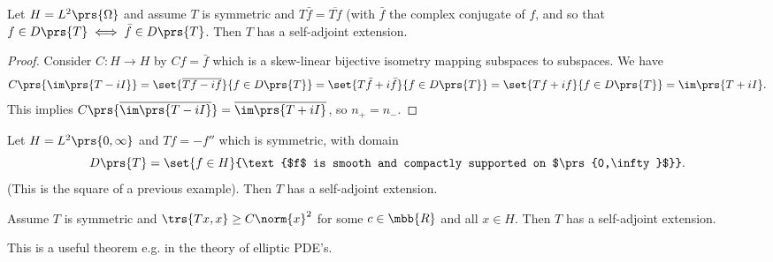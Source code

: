 \documentclass[10pt, twoside]{book}
\begin{document}
\begin{proposition}
Let $H = L^2\prs{\Omega}$ and assume $T$ is symmetric and $T \bar{f} = \overline{Tf}$ (with $\bar{f}$ the complex conjugate of $f$, and so that $f \in D\prs{T} \iff \bar{f} \in D\prs{T}$. Then $T$ has a self-adjoint extension.
\end{proposition}

\begin{proof}
Consider $C \colon H \to H$ by $Cf = \bar{f}$ which is a skew-linear bijective isometry mapping subspaces to subspaces.
We have
\[C\prs{\im\prs{T - iI}} = \set{\overline{Tf - if}}{f \in D\prs{T}} = \set{T \bar{f} + i\bar{f}}{f \in D\prs{T}} = \set{Tf + if}{f \in D\prs{T}} = \im\prs{T + iI} \text{.}\]
This implies
$C\prs{\overline{\im\prs{T - iI}}} = \overline{\im\prs{T+iI}}$, so $n_+ = n_-$.
\end{proof}

\begin{example}
Let $H = L^2\prs{0,\infty}$ and $Tf = -f''$ which is symmetric, with domain
\[D\prs{T} = \set{f \in H}{\text{$f$ is smooth and compactly supported on $\prs{0,\infty}$}} \text{.}\]
(This is the square of a previous example). Then $T$ has a self-adjoint extension.
\end{example}

\begin{theorem}
Assume $T$ is symmetric and $\trs{Tx, x} \geq C\norm{x}^2$ for some $c \in \mbb{R}$ and all $x \in H$. Then $T$ has a self-adjoint extension.
\end{theorem}

\begin{remark}
This is a useful theorem e.g. in the theory of elliptic PDE's.
\end{remark}
\end{document}
